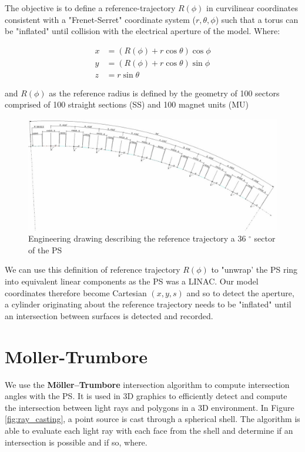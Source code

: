 The objective is to define a reference-trajectory $R(\phi)$ in curvilinear coordinates consistent with a "Frenet-Serret" coordinate system ($r,\theta,\phi$) such that a torus can be "inflated" until collision with the electrical aperture of the model. Where:

$$\begin{aligned}
        x & = (R(\phi)+r\cos\theta)\cos\phi \\
        y & = (R(\phi)+r\cos\theta)\sin\phi \\
        z & = r\sin\theta
    \end{aligned}$$

and $R(\phi)$ as the reference radius is defined by the geometry of 100 sectors comprised of 100 straight sections (SS) and 100 magnet units (MU)

\begin{figure}
    \centering
    \includegraphics{figs/reference_trajectory_path.jpg}
    \caption{Engineering drawing describing the reference trajectory a 36 $^\circ$ sector of the PS}
    \label{fig:ref_traj}
\end{figure}

We can use this definition of reference trajectory $R(\phi)$ to "unwrap' the PS ring into equivalent linear components as the PS was a LINAC. Our model coordinates therefore become Cartesian $(x, y, s)$ and so to detect the aperture, a cylinder originating about the reference trajectory needs to be "inflated" until an intersection between surfaces is detected and recorded.

\section{Moller-Trumbore}

We use the \textbf{Möller–Trumbore}\cite{moller_fast_1997} intersection algorithm to compute intersection angles with the PS. It is used in 3D graphics to efficiently detect and compute the intersection between light rays and polygons in a 3D environment. In Figure  \ref{fig:ray_casting}, a point source is cast through a spherical shell. The algorithm is able to evaluate each light ray with each face from the shell and determine if an intersection is possible and if so, where.

